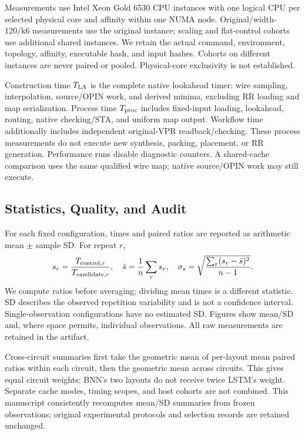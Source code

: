 \documentclass[conference,10pt,letterpaper]{IEEEtran}
\begin{document}
Measurements use Intel Xeon Gold 6530 CPU instances with one logical CPU per selected physical core and affinity within one NUMA node. Original/width-120/k6 measurements use the original instance; scaling and flat-control cohorts use additional shared instances. We retain the actual command, environment, topology, affinity, executable hash, and input hashes. Cohorts on different instances are never paired or pooled. Physical-core exclusivity is not established.

Construction time $T_{\rm LA}$ is the complete native lookahead timer: wire sampling, interpolation, source/OPIN work, and derived minima, excluding RR loading and map serialization. Process time $T_{\rm proc}$ includes fixed-input loading, lookahead, routing, native checking/STA, and uniform map output. Workflow time additionally includes independent original-VPR readback/checking. These process measurements do not execute new synthesis, packing, placement, or RR generation. Performance runs disable diagnostic counters. A shared-cache comparison uses the same qualified wire map; native source/OPIN work may still execute.

\subsection{Statistics, Quality, and Audit}
For each fixed configuration, times and paired ratios are reported as arithmetic mean $\pm$ sample SD. For repeat $r$,
\begin{equation}
 s_r=\frac{T_{{\rm control},r}}{T_{{\rm candidate},r}},\quad
 \bar{s}=\frac{1}{n}\sum_rs_r,\quad
 \sigma_s=\sqrt{\frac{\sum_r(s_r-\bar{s})^2}{n-1}}.
\end{equation}
We compute ratios before averaging; dividing mean times is a different statistic. SD describes the observed repetition variability and is not a confidence interval. Single-observation configurations have no estimated SD. Figures show mean/SD and, where space permits, individual observations. All raw measurements are retained in the artifact.

Cross-circuit summaries first take the geometric mean of per-layout mean paired ratios within each circuit, then the geometric mean across circuits. This gives equal circuit weights; BNN's two layouts do not receive twice LSTM's weight. Separate cache modes, timing scopes, and host cohorts are not combined. This manuscript consistently recomputes mean/SD summaries from frozen observations; original experimental protocols and selection records are retained unchanged.
\end{document}
